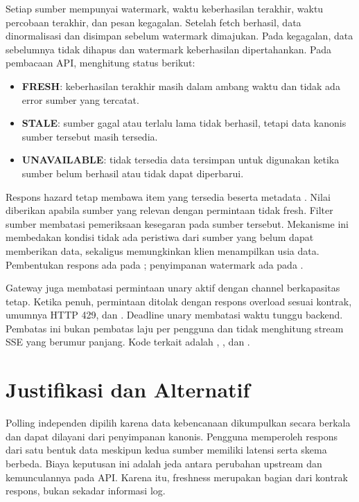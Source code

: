 Setiap sumber mempunyai watermark, waktu keberhasilan terakhir, waktu percobaan
terakhir, dan pesan kegagalan. Setelah fetch berhasil, data dinormalisasi dan
disimpan sebelum watermark dimajukan. Pada kegagalan, data sebelumnya tidak
dihapus dan watermark keberhasilan dipertahankan. Pada pembacaan API,
 menghitung status berikut:
\begin{itemize}
    \item \textbf{FRESH}: keberhasilan terakhir masih dalam ambang waktu dan
    tidak ada error sumber yang tercatat.
    \item \textbf{STALE}: sumber gagal atau terlalu lama tidak berhasil,
    tetapi data kanonis sumber tersebut masih tersedia.
    \item \textbf{UNAVAILABLE}: tidak tersedia data tersimpan untuk digunakan
    ketika sumber belum berhasil atau tidak dapat diperbarui.
\end{itemize}

Respons hazard tetap membawa item yang tersedia beserta metadata
. Nilai  diberikan apabila sumber yang
relevan dengan permintaan tidak fresh. Filter sumber membatasi pemeriksaan
kesegaran pada sumber tersebut. Mekanisme ini membedakan kondisi tidak ada
peristiwa dari sumber yang belum dapat memberikan data, sekaligus memungkinkan
klien menampilkan usia data. Pembentukan respons ada pada
; penyimpanan watermark ada
pada .

Gateway juga membatasi permintaan unary aktif dengan channel berkapasitas
tetap. Ketika penuh, permintaan ditolak dengan respons overload sesuai kontrak,
umumnya HTTP 429, dan . Deadline unary membatasi waktu tunggu
backend. Pembatas ini bukan pembatas laju per pengguna dan tidak menghitung
stream SSE yang berumur panjang. Kode terkait adalah
,
, dan
.

\section{Justifikasi dan Alternatif}

Polling independen dipilih karena data kebencanaan dikumpulkan secara berkala
dan dapat dilayani dari penyimpanan kanonis. Pengguna memperoleh respons dari
satu bentuk data meskipun kedua sumber memiliki latensi serta skema berbeda.
Biaya keputusan ini adalah jeda antara perubahan upstream dan kemunculannya
pada API. Karena itu, freshness merupakan bagian dari kontrak respons, bukan
sekadar informasi log.

